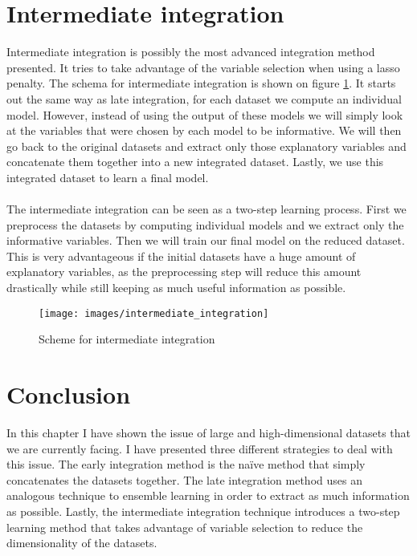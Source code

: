 \section{Intermediate integration}
\label{sec:integration-intermediate}
Intermediate integration is possibly the most advanced integration method presented. It tries to take advantage of the variable selection when using a lasso penalty. The schema for intermediate integration is shown on figure \ref{fig:integration-intermediate}. It starts out the same way as late integration, for each dataset we compute an individual model. However, instead of using the output of these models we will simply look at the variables that were chosen by each model to be informative. We will then go back to the original datasets and extract only those explanatory variables and concatenate them together into a new integrated dataset. Lastly, we use this integrated dataset to learn a final model. \\ \\
The intermediate integration can be seen as a two-step learning process. First we preprocess the datasets by computing individual models and we extract only the informative variables. Then we will train our final model on the reduced dataset. This is very advantageous if the initial datasets have a huge amount of explanatory variables, as the preprocessing step will reduce this amount drastically while still keeping as much useful information as possible.
\begin{figure}
	\centering
	\texttt{[image: images/intermediate\_integration]}
	\caption{Scheme for intermediate integration}
	\label{fig:integration-intermediate}
\end{figure}
\section{Conclusion}
\label{sec:integration-conclusion}
In this chapter I have shown the issue of large and high-dimensional datasets that we are currently facing. I have presented three different strategies to deal with this issue. The early integration method is the na\"{i}ve method that simply concatenates the datasets together. The late integration method uses an analogous technique to ensemble learning in order to extract as much information as possible. Lastly, the intermediate integration technique introduces a two-step learning method that takes advantage of variable selection to reduce the dimensionality of the datasets.
